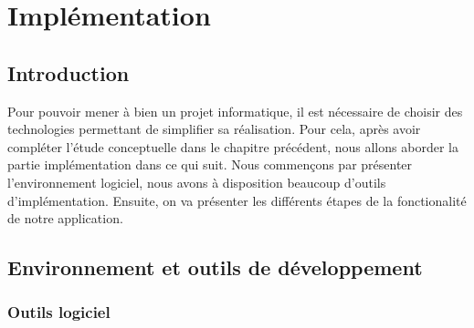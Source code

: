 \documentclass[french,a4,12pt]{report}
\begin{document}
\pagestyle{fancy} 
\chapter{Implémentation}
\chead{}
\lhead{\bfseries \chaptername {\,} \thechapter }
\cfoot{\bfseries \thepage}
\rhead{} 
\begin{tcolorbox}[leftrule=3mm]
	\section{Introduction}
\end{tcolorbox}
Pour pouvoir mener à bien un projet informatique, il est nécessaire de choisir des technologies permettant de simplifier sa réalisation. Pour cela, après avoir compléter l'étude conceptuelle dans le chapitre précédent, nous allons aborder la partie implémentation dans ce qui suit. Nous commençons par présenter l’environnement logiciel, nous avons à disposition beaucoup d’outils d'implémentation. Ensuite, on va présenter les différents étapes de la  fonctionalité de notre application.
\begin{tcolorbox}[leftrule=3mm]
	\section{Environnement et outils de développement} 
\end{tcolorbox}
\begin{tcolorbox}[colframe=green!75,rightrule=0.5cm,leftrule=0.5cm,]
	\centering
	\subsection{Outils logiciel}
\end{tcolorbox}
\end{document}
